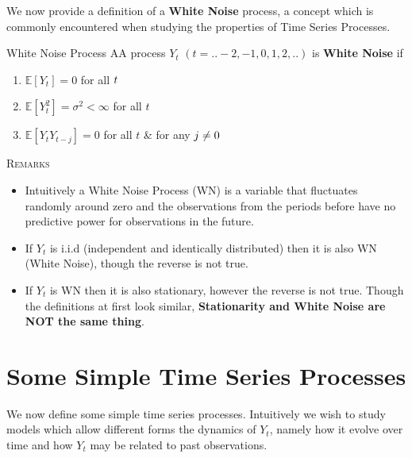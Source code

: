 \documentclass[openany]{tufte-book} %
\begin{document}
We now provide a definition of a \textbf{White Noise} process, a concept which is commonly encountered when studying the properties of  Time Series Processes.

\begin{mydef}{White Noise Process} AA process $Y_t$  $(t=..-2,-1,0,1,2,..)$ is \textbf{White Noise} if

\begin{enumerate}
\item $\mathbb{E}[Y_{t}]=0$ for all $t\medskip $


\item $\mathbb{E}[Y_{t}^{2}]=\sigma ^{2}<\infty$ for all $t$ \medskip

\item $\mathbb{E}[Y_{t}Y_{t-j}]=0$ for all $t$ \& for any $%
j\neq 0\medskip $
\end{enumerate} \end{mydef}


\textsc{Remarks}
\begin{itemize}
\item Intuitively a White Noise Process (WN) is a variable that fluctuates randomly around zero and the observations from the periods before have no predictive power for observations in the future.
    \item If $Y_t$ is i.i.d (independent and identically distributed) then it is also WN (White Noise), though the reverse is not true.
        \item If $Y_t$ is WN then it is also stationary, however the reverse is not true. Though the definitions at first look  similar, \textbf{Stationarity and White Noise are NOT the same thing}.
            \end{itemize}

\section{Some Simple Time Series Processes}
We now define some simple time series processes. Intuitively we wish to study models which allow different forms  the dynamics of $Y_t$, namely   how it evolve over time and  how $Y_t$ may be related to past observations.\newline
\end{document}
